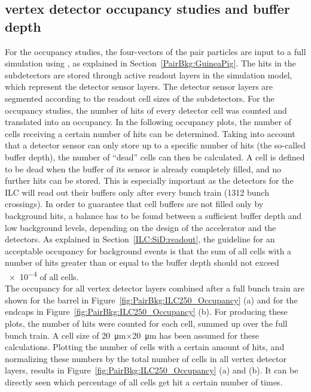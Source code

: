 \subsection{\sid vertex detector occupancy studies and buffer depth}
\label{PairBkg:occupancy}
For the occupancy studies, the \guineapig four-vectors of the pair particles are input to a full \sid simulation using \slic, as explained in Section~\ref{PairBkg:GuineaPig}.
The hits in the \sid subdetectors are stored through active readout layers in the simulation model, which represent the detector sensor layers.
The detector sensor layers are segmented according to the readout cell sizes of the \sid subdetectors.
For the occupancy studies, the number of hits of every detector cell was counted and translated into an occupancy.
In the following occupancy plots, the number of cells receiving a certain number of hits can be determined.
Taking into account that a detector sensor can only store up to a specific number of hits (the so-called buffer depth), the number of ``dead'' cells can then be calculated.
A cell is defined to be dead when the buffer of its sensor is already completely filled, and no further hits can be stored.
This is especially important as the detectors for the ILC will read out their buffers only after every bunch train (\num{1312} bunch crossings).
In order to guarantee that cell buffers are not filled only by background hits, a balance has to be found between a sufficient buffer depth and low background levels, depending on the design of the accelerator and the detectors.
As explained in Section~\ref{ILC:SiD:readout}, the \sid guideline for an acceptable occupancy for background events is that the sum of all cells with a number of hits greater than or equal to the buffer depth should not exceed \num{e-4} of all cells.\\
The occupancy for all vertex detector layers combined after a full bunch train are shown for the barrel in Figure~\ref{fig:PairBkg:ILC250_Occupancy} (a) and for the endcaps in Figure~\ref{fig:PairBkg:ILC250_Occupancy} (b).
For producing these plots, the number of hits were counted for each cell, summed up over the full bunch train.
A cell size of \SI{20}{\micro\meter}$\times$\SI{20}{\micro\meter} has been assumed for these calculations.
Plotting the number of cells with a certain amount of hits, and normalizing these numbers by the total number of cells in all vertex detector layers, results in Figure~\ref{fig:PairBkg:ILC250_Occupancy} (a) and (b).
It can be directly seen which percentage of all cells get hit a certain number of times.
